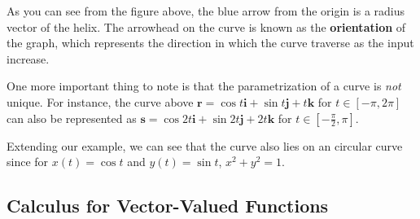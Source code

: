 \documentclass[../../../main.tex]{subfiles}
\begin{document}
\begin{figure}[H]
\centering
{}
\end{figure}

As you can see from the figure above, the blue arrow from the origin
is a radius vector of the helix. The arrowhead on the curve is known
as the \textbf{orientation} of the graph, which represents the
direction in which the curve traverse as the input increase.

\begin{important}
One more important thing to note is that the parametrization of a
curve is \textit{not} unique. For instance, the curve above
$\mathbf{r} = \cos t \mathbf{i} + \sin t \mathbf{j} + t \mathbf{k}$
for $t \in [-\pi, 2\pi]$ can also be represented as
$\mathbf{s} = \cos 2t \mathbf{i} + \sin 2t \mathbf{j} + 2t \mathbf{k}$
for $t \in [-\frac{\pi}{2}, \pi]$.
\end{important}

Extending our example, we can see that the curve also lies on an
circular curve since for $x(t) = \cos t$ and $y(t) = \sin t$,
$x^2 + y^2 = 1$.

\subsection{Calculus for Vector-Valued Functions}
\end{document}
